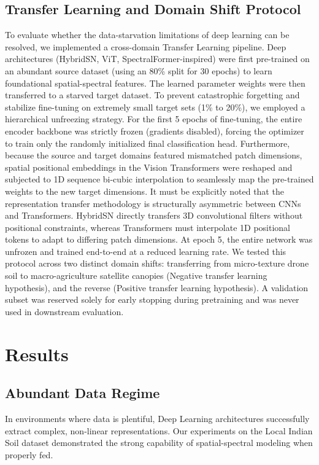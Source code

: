 \documentclass[pdflatex,sn-mathphys-num,iicol]{sn-jnl}
\begin{document}
\subsection{Transfer Learning and Domain Shift Protocol}
To evaluate whether the data-starvation limitations of deep learning can be resolved, we implemented a cross-domain Transfer Learning pipeline. Deep architectures (HybridSN, ViT, SpectralFormer-inspired) were first pre-trained on an abundant source dataset (using an 80\% split for 30 epochs) to learn foundational spatial-spectral features. The learned parameter weights were then transferred to a starved target dataset. To prevent catastrophic forgetting and stabilize fine-tuning on extremely small target sets (1\% to 20\%), we employed a hierarchical unfreezing strategy. For the first 5 epochs of fine-tuning, the entire encoder backbone was strictly frozen (gradients disabled), forcing the optimizer to train only the randomly initialized final classification head. Furthermore, because the source and target domains featured mismatched patch dimensions, spatial positional embeddings in the Vision Transformers were reshaped and subjected to 1D sequence bi-cubic interpolation to seamlessly map the pre-trained weights to the new target dimensions. It must be explicitly noted that the representation transfer methodology is structurally asymmetric between CNNs and Transformers. HybridSN directly transfers 3D convolutional filters without positional constraints, whereas Transformers must interpolate 1D positional tokens to adapt to differing patch dimensions. At epoch 5, the entire network was unfrozen and trained end-to-end at a reduced learning rate. We tested this protocol across two distinct domain shifts: transferring from micro-texture drone soil to macro-agriculture satellite canopies (Negative transfer learning hypothesis), and the reverse (Positive transfer learning hypothesis). A validation subset was reserved solely for early stopping during pretraining and was never used in downstream evaluation.

\section{Results}\label{sec:results}

\subsection{Abundant Data Regime}
\par In environments where data is plentiful, Deep Learning architectures successfully extract complex, non-linear representations. Our experiments on the Local Indian Soil dataset demonstrated the strong capability of spatial-spectral modeling when properly fed. 
\end{document}
